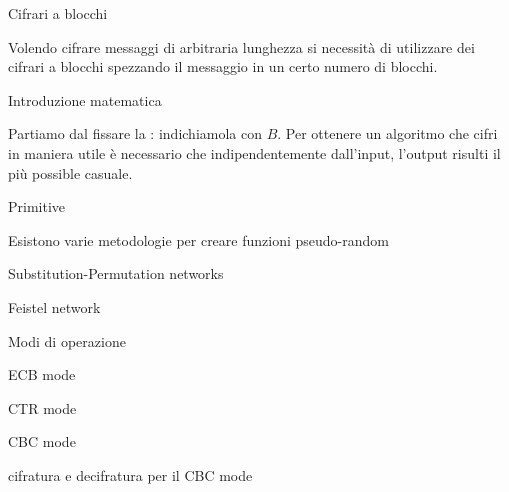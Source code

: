 \capitolo Cifrari a blocchi

Volendo cifrare messaggi di arbitraria lunghezza si necessit\`a di utilizzare dei
cifrari a blocchi spezzando il messaggio in un certo numero di blocchi.

\sezione Introduzione matematica

Partiamo dal fissare la : indichiamola con $B$.
Per ottenere un algoritmo che cifri in maniera utile \`e necessario che indipendentemente
dall'input, l'output risulti il pi\`u possible casuale.

\sezione Primitive

Esistono varie metodologie per creare funzioni pseudo-random

\sottosezione Substitution-Permutation networks

\sottosezione Feistel network


\sezione Modi di operazione

\sottosezione ECB mode



\sottosezione CTR mode

\sottosezione CBC mode

\picture cifratura e decifratura per il CBC mode



\endpicture

